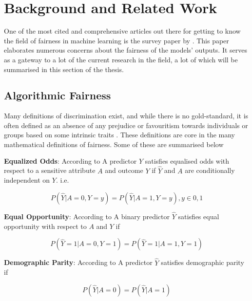 \chapter{Background and Related Work}
\label{ch:related}

One of the most cited and comprehensive articles out there for getting to know the field of fairness in machine learning is the survey paper by \citet{Mehrabi:2021:CSUR}. This paper elaborates numerous concerns about the fairness of the models’ outputs. It serves as a gateway to a lot of the current research in the field, a lot of which will be summarised in this section of the thesis.

\section{Algorithmic Fairness}

Many definitions of discrimination exist, and while there is no gold-standard, it is often defined as an absence of any prejudice or favouritism towards individuals or groups based on some intrinsic traits \cite{Mehrabi:2021:CSUR, Nripsuta:2019:AIES}. These definitions are core in the many mathematical definitions of fairness. Some of these are summarised below

\textbf{Equalized Odds}: According to \citet{Mehrabi:2021:CSUR, Hardt:2016:NIPS} A predictor $\hat{Y}$ satisfies equalised odds with respect to a sensitive attribute $A$ and outcome $Y$ if $\hat{Y}$ and $A$ are conditionally independent on $Y$. i.e.

\begin{equation*}
    P(\hat{Y}|A=0, Y=y) = P(\hat{Y}|A=1, Y=y), y \in {0, 1}
\end{equation*}

\textbf{Equal Opportunity}: According to \citet{Mehrabi:2021:CSUR, Hardt:2016:NIPS} A binary predictor $\hat{Y}$ satisfies equal opportunity with respect to $A$ and $Y$ if

\begin{equation*}
    P(\hat{Y}=1|A=0, Y=1) = P(\hat{Y}=1|A=1, Y=1)
\end{equation*}

\textbf{Demographic Parity}: According to \citet{Mehrabi:2021:CSUR, Dwork:2012:ITCS} A predictor $\hat{Y}$ satisfies demographic parity if 

\begin{equation}
    P(\hat{Y}|A=0) = P(\hat{Y}|A=1)
    \label{eq:dempar}
\end{equation}

